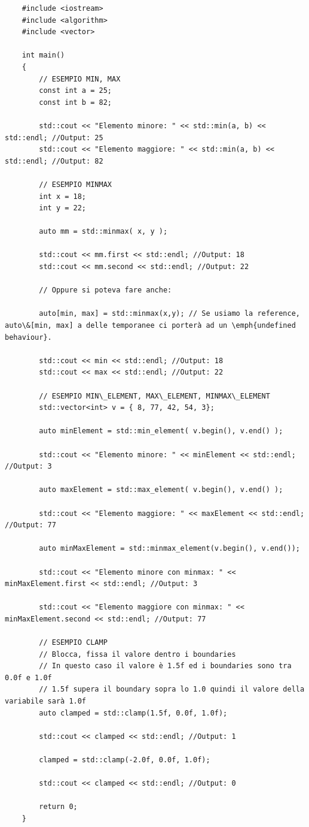\begin{lstlisting}
	#include <iostream>
	#include <algorithm>
	#include <vector>
	
	int main()
	{
		// ESEMPIO MIN, MAX
		const int a = 25;
		const int b = 82;
		
		std::cout << "Elemento minore: " << std::min(a, b) << std::endl; //Output: 25
		std::cout << "Elemento maggiore: " << std::min(a, b) << std::endl; //Output: 82
		
		// ESEMPIO MINMAX
		int x = 18;
		int y = 22;
		
		auto mm = std::minmax( x, y );
		
		std::cout << mm.first << std::endl; //Output: 18
		std::cout << mm.second << std::endl; //Output: 22
		
		// Oppure si poteva fare anche:
		
		auto[min, max] = std::minmax(x,y); // Se usiamo la reference, auto\&[min, max] a delle temporanee ci porterà ad un \emph{undefined behaviour}.
		
		std::cout << min << std::endl; //Output: 18
		std::cout << max << std::endl; //Output: 22
		
		// ESEMPIO MIN\_ELEMENT, MAX\_ELEMENT, MINMAX\_ELEMENT
		std::vector<int> v = { 8, 77, 42, 54, 3};
		
		auto minElement = std::min_element( v.begin(), v.end() );
		
		std::cout << "Elemento minore: " << minElement << std::endl; //Output: 3
		
		auto maxElement = std::max_element( v.begin(), v.end() ); 
		
		std::cout << "Elemento maggiore: " << maxElement << std::endl; //Output: 77
		
		auto minMaxElement = std::minmax_element(v.begin(), v.end());
		
		std::cout << "Elemento minore con minmax: " << minMaxElement.first << std::endl; //Output: 3
		
		std::cout << "Elemento maggiore con minmax: " << minMaxElement.second << std::endl; //Output: 77
		
		// ESEMPIO CLAMP
		// Blocca, fissa il valore dentro i boundaries
		// In questo caso il valore è 1.5f ed i boundaries sono tra 0.0f e 1.0f
		// 1.5f supera il boundary sopra lo 1.0 quindi il valore della variabile sarà 1.0f
		auto clamped = std::clamp(1.5f, 0.0f, 1.0f);
		
		std::cout << clamped << std::endl; //Output: 1
		
		clamped = std::clamp(-2.0f, 0.0f, 1.0f);
		
		std::cout << clamped << std::endl; //Output: 0
		
		return 0;
	}
\end{lstlisting}

